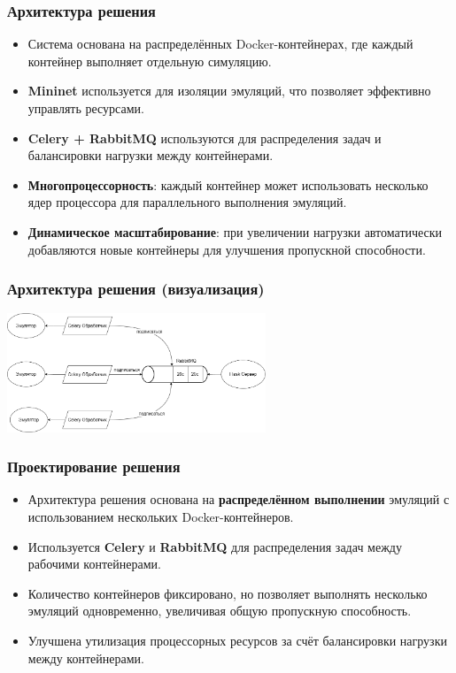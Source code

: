 \documentclass{beamer}
\begin{document}
\begin{frame}[fragile]
  \frametitle{Архитектура решения}
  \begin{itemize}
    \item Система основана на распределённых Docker-контейнерах, где каждый контейнер выполняет отдельную симуляцию.
    \item \textbf{Mininet} используется для изоляции эмуляций, что позволяет эффективно управлять ресурсами.
    \item \textbf{Celery + RabbitMQ} используются для распределения задач и балансировки нагрузки между контейнерами.
    \item \textbf{Многопроцессорность}: каждый контейнер может использовать несколько ядер процессора для параллельного выполнения эмуляций.
    \item \textbf{Динамическое масштабирование}: при увеличении нагрузки автоматически добавляются новые контейнеры для улучшения пропускной способности.
  \end{itemize}
\end{frame}


\begin{frame}[fragile]
  \frametitle{Архитектура решения (визуализация)}
  \begin{center}
    \includegraphics[width=0.58\textwidth]{parallel.png}
  \end{center}
\end{frame}

\begin{frame}[fragile]
  \frametitle{Проектирование решения}
  \begin{itemize}
    \item Архитектура решения основана на \textbf{распределённом выполнении} эмуляций с использованием нескольких Docker-контейнеров.
    \item Используется \textbf{Celery} и \textbf{RabbitMQ} для распределения задач между рабочими контейнерами.
    \item Количество контейнеров фиксировано, но позволяет выполнять несколько эмуляций одновременно, увеличивая общую пропускную способность.
    \item Улучшена утилизация процессорных ресурсов за счёт балансировки нагрузки между контейнерами.
  \end{itemize}
\end{frame}
\end{document}
